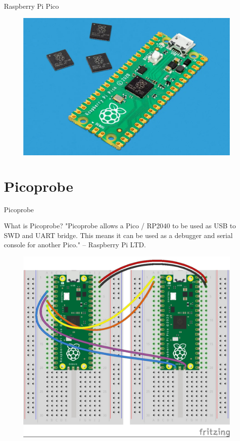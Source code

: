 \documentclass{beamer}
\begin{document}
\begin{frame}{Raspberry Pi Pico}
\begin{figure}
	\includegraphics[width=.9\linewidth,height=.7\linewidth]{images/pico-rp2040.jpg}
\end{figure}
\end{frame}

\section{Picoprobe}
\begin{frame}{Picoprobe}
	\begin{block}{What is Picoprobe?}
		"Picoprobe allows a Pico / RP2040 to be used as USB to SWD and UART bridge. This means it can be used as a debugger and serial console for another Pico." -- Raspberry Pi LTD.
	\end{block}
\begin{figure}
	\includegraphics[width=.6\linewidth,height=.7\linewidth]{images/picoprobe_connection.jpeg}
\end{figure}
\end{frame}
\end{document}
